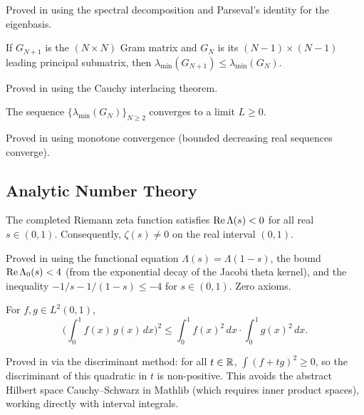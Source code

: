 \documentclass[11pt,a4paper]{article}
\begin{document}
Proved in  using the spectral
decomposition and Parseval's identity for the eigenbasis.

\begin{theorem}
\label{thm:interlacing}
If $G_{N+1}$ is the $(N \times N)$ Gram matrix and $G_N$ is its
$(N-1) \times (N-1)$ leading principal submatrix, then
$\lambda_{\min}(G_{N+1}) \leq \lambda_{\min}(G_N)$.
\end{theorem}

Proved in  using the Cauchy
interlacing theorem.

\begin{theorem}
\label{thm:eiglimit}
The sequence $\{\lambda_{\min}(G_N)\}_{N \geq 2}$ converges to a
limit $L \geq 0$.
\end{theorem}

Proved in  using monotone convergence
(bounded decreasing real sequences converge).

\subsection{Analytic Number Theory}

\begin{theorem}
\label{thm:theta}
The completed Riemann zeta function satisfies
$\operatorname{Re}\Lambda(s) < 0$ for all real $s \in (0,1)$. Consequently,
$\zeta(s) \neq 0$ on the real interval $(0,1)$.
\end{theorem}

Proved in  using the functional
equation $\Lambda(s) = \Lambda(1-s)$, the bound
$\operatorname{Re}\Lambda_0(s) < 4$ (from the exponential decay of the Jacobi
theta kernel), and the inequality $-1/s - 1/(1-s) \leq -4$
for $s \in (0,1)$. Zero axioms.

\begin{theorem}
\label{thm:csbd}
For $f, g \in L^2(0,1)$,
\[
  \biggl(\int_0^1 f(x)\,g(x)\,dx\biggr)^2 \leq
  \int_0^1 f(x)^2\,dx \cdot \int_0^1 g(x)^2\,dx.
\]
\end{theorem}

Proved in  via the discriminant method: for all
$t \in \mathbb{R}$, $\int(f + tg)^2 \geq 0$, so the discriminant of this
quadratic in $t$ is non-positive. This avoids the abstract Hilbert
space Cauchy--Schwarz in Mathlib (which requires inner product spaces),
working directly with interval integrals.
\end{document}
